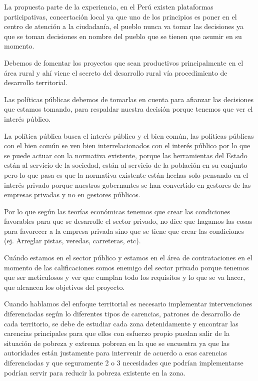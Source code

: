\documentclass[
  jou,
  floatsintext,
  longtable,
  a4paper,
  nolmodern,
  notxfonts,
  notimes,
  12pt,
  colorlinks=true,linkcolor=blue,citecolor=blue,urlcolor=blue]{apa7}
\begin{document}
La propuesta parte de la experiencia, en el Perú existen plataformas
participativas, concertación local ya que uno de los principios es poner
en el centro de atención a la ciudadanía, el pueblo nunca va tomar las
decisiones ya que se toman decisiones en nombre del pueblo que se tienen
que asumir en su momento.

Debemos de fomentar los proyectos que sean productivos principalmente en
el área rural y ahí viene el secreto del desarrollo rural vía
procedimiento de desarrollo territorial.

Las políticas públicas debemos de tomarlas en cuenta para afianzar las
decisiones que estamos tomando, para respaldar nuestra decisión porque
tenemos que ver el interés público.

La política pública busca el interés público y el bien común, las
políticas públicas con el bien común se ven bien interrelacionados con
el interés público por lo que se puede actuar con la normativa
existente, porque las herramientas del Estado están al servicio de la
sociedad, están al servicio de la población en su conjunto pero lo que
pasa es que la normativa existente están hechas solo pensando en el
interés privado porque nuestros gobernantes se han convertido en
gestores de las empresas privadas y no en gestores públicos.

Por lo que según las teorías económicas tenemos que crear las
condiciones favorables para que se desarrolle el sector privado, no dice
que hagamos las cosas para favorecer a la empresa privada sino que se
tiene que crear las condiciones (ej. Arreglar pistas, veredas,
carreteras, etc).

Cuándo estamos en el sector público y estamos en el área de
contrataciones en el momento de las calificaciones somos enemigo del
sector privado porque tenemos que ser meticulosos y ver que cumplan todo
los requisitos y lo que se va hacer, que alcancen los objetivos del
proyecto.

Cuando hablamos del enfoque territorial es necesario implementar
intervenciones diferenciadas según lo diferentes tipos de carencias,
patrones de desarrollo de cada territorio, se debe de estudiar cada zona
detenidamente y encontrar las carencias principales para que ellos con
esfuerzo propio puedan salir de la situación de pobreza y extrema
pobreza en la que se encuentra ya que las autoridades están justamente
para intervenir de acuerdo a esas carencias diferenciadas y que
seguramente 2 o 3 necesidades que podrían implementarse podrían servir
para reducir la pobreza existente en la zona.
\end{document}
